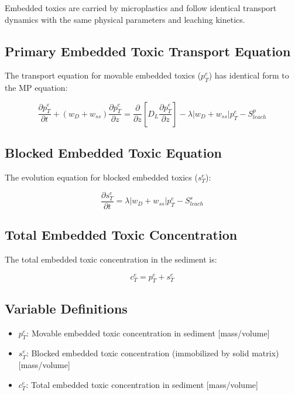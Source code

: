 \documentclass[11pt,a4paper]{article}
\begin{document}
Embedded toxics are carried by microplastics and follow identical transport dynamics with the same physical parameters and leaching kinetics.

\subsection{Primary Embedded Toxic Transport Equation}

The transport equation for movable embedded toxics ($p_T^e$) has identical form to the MP equation:

\begin{equation}
\boxed{
\frac{\partial p_T^e}{\partial t} + (w_D + w_{ss}) \frac{\partial p_T^e}{\partial z} = \frac{\partial}{\partial z}\left[D_L \frac{\partial p_T^e}{\partial z}\right] - \lambda|w_D + w_{ss}|p_T^e - S_{leach}^p
}
\end{equation}

\subsection{Blocked Embedded Toxic Equation}

The evolution equation for blocked embedded toxics ($s_T^e$):

\begin{equation}
\boxed{
\frac{\partial s_T^e}{\partial t} = \lambda|w_D + w_{ss}|p_T^e - S_{leach}^s
}
\end{equation}

\subsection{Total Embedded Toxic Concentration}

The total embedded toxic concentration in the sediment is:

\begin{equation}
\boxed{
c_T^e = p_T^e + s_T^e
}
\end{equation}

\subsection{Variable Definitions}

\begin{itemize}
    \item $p_T^e$: Movable embedded toxic concentration in sediment [mass/volume]
    \item $s_T^e$: Blocked embedded toxic concentration (immobilized by solid matrix) [mass/volume]
    \item $c_T^e$: Total embedded toxic concentration in sediment [mass/volume]
\end{itemize}
\end{document}
